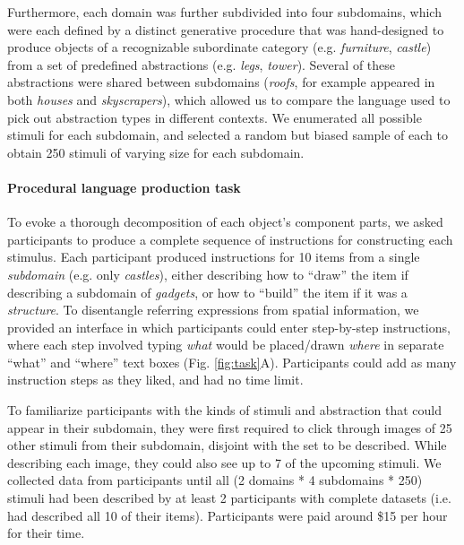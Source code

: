 \documentclass[10pt,letterpaper]{article}
\begin{document}
Furthermore, each domain was further subdivided into four subdomains, which were each defined by a distinct generative procedure that was hand-designed to produce objects of a recognizable subordinate category (e.g. \textit{furniture}, \textit{castle}) from a set of predefined abstractions (e.g. \textit{legs}, \textit{tower}).
Several of these abstractions were shared between subdomains (\textit{roofs}, for example appeared in both \textit{houses} and \textit{skyscrapers}), which allowed us to compare the language used to pick out abstraction types in different contexts.
We enumerated all possible stimuli for each subdomain, and selected a random but biased sample of each to obtain 250 stimuli of varying size for each subdomain.


\paragraph{Procedural language production task}

To evoke a thorough decomposition of each object's component parts, we asked participants to produce a complete sequence of instructions for constructing each stimulus.
Each participant produced instructions for 10 items from a single \textit{subdomain} (e.g. only \textit{castles}), either describing how to ``draw'' the item if describing a subdomain of \textit{gadgets}, or how to ``build'' the item if it was a \textit{structure}.
To disentangle referring expressions from spatial information, we provided an interface in which participants could enter step-by-step instructions, where each step involved typing \textit{what} would be placed/drawn \textit{where} in separate ``what'' and ``where'' text boxes (Fig. \ref{fig:task}A).
Participants could add as many instruction steps as they liked, and had no time limit.

To familiarize participants with the kinds of stimuli and abstraction that could appear in their subdomain, they were first required to click through images of 25 other stimuli from their subdomain, disjoint with the set to be described. 
While describing each image, they could also see up to 7 of the upcoming stimuli.
We collected data from participants until all (2 domains * 4 subdomains * 250) stimuli had been described by at least 2 participants with complete datasets (i.e. had described all 10 of their items).
Participants were paid around \$15 per hour for their time. 
\end{document}
